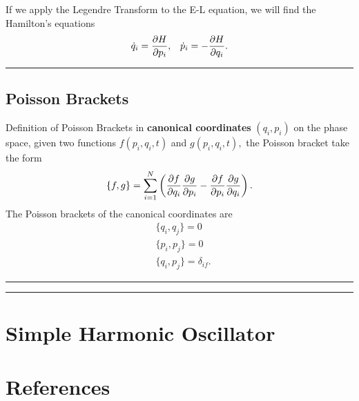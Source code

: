 \documentclass[12pt,english]{article}
\numberwithin{equation}{subsection}
\begin{document}
If we apply the Legendre Transform to the E-L equation, we will find the Hamilton's equations
\begin{align}
    \dot{q}_i = \pdv{H}{p_i}, && \dot{p}_i = -\pdv{H}{q_i}.
\end{align}
\par\noindent\rule{\textwidth}{0.4pt}
\subsection{Poisson Brackets}
Definition of Poisson Brackets in \textbf{canonical coordinates} $(q_i, p_i)$ on the phase space, given two functions $f(p_i, q_i, t)$ and $g(p_i, q_i, t),$ the Poisson bracket take the form \cite{noauthor_poissonbracket_2021}
\begin{equation}
    \{f,g\} = \sum_{i = 1}^{N} \left(\pdv{f}{q_i}\pdv{g}{p_i}-\pdv{f}{p_i}\pdv{g}{q_i}\right).
\end{equation}
The Poisson brackets of the canonical coordinates are 
\begin{align*}
    &\{q_i,q_j\}=0\\
    &\{p_i,p_j\}=0\\
    &\{q_i,p_j\}=\delta_{if}.
\end{align*}


\par\noindent\rule{\textwidth}{0.4pt}
\par\noindent\rule{\textwidth}{0.4pt}
\section{Simple Harmonic Oscillator}









\newpage
\section*{References}
\printbibliography[heading = none]
\end{document}
